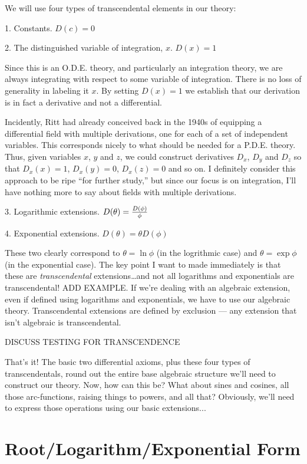 We will use four types of transcendental elements in our theory:

1. Constants.  $D(c)=0$

2. The distinguished variable of integration, $x$.  $D(x)=1$

Since this is an O.D.E. theory, and particularly an integration
theory, we are always integrating with respect to some variable of
integration.  There is no loss of generality in labeling it $x$.  By
setting $D(x)=1$ we establish that our derivation is in fact a
derivative and not a differential.

Incidently, Ritt had already conceived back in the 1940s of equipping
a differential field with multiple derivations, one for each of a set
of independent variables.  This corresponds nicely to what should be
needed for a P.D.E. theory.  Thus, given variables $x$, $y$ and $z$,
we could construct derivatives $D_x$, $D_y$ and $D_z$ so that
$D_x(x)=1$, $D_x(y)=0$, $D_x(z)=0$ and so on.  I definitely consider
this approach to be ripe ``for further study,'' but since our focus is
on integration, I'll have nothing more to say about fields with
multiple derivations.

3. Logarithmic extensions. $D(\theta)={D(\phi)\over{\phi}}$

4. Exponential extensions. $D(\theta)=\theta D(\phi)$

These two clearly correspond to $\theta = \ln\phi$ (in the logrithmic
case) and $\theta = \exp\phi$ (in the exponential case).  The key
point I want to made immediately is that these are {\it
transcendental} extensions\ldots and not all logarithms and
exponentials are transcendental!  ADD EXAMPLE.  If we're dealing with
an algebraic extension, even if defined using logarithms and
exponentials, we have to use our algebraic theory.  Transcendental
extensions are defined by exclusion --- any extension that isn't
algebraic is transcendental.

DISCUSS TESTING FOR TRANSCENDENCE

That's it!  The basic two differential axioms, plus these four types
of transcendentals, round out the entire base algebraic structure
we'll need to construct our theory.  Now, how can this be?  What
about sines and cosines, all those arc-functions, raising things
to powers, and all that?  Obviously, we'll need to express those
operations using our basic extensions...

\vfill\eject

\section{Root/Logarithm/Exponential Form}

